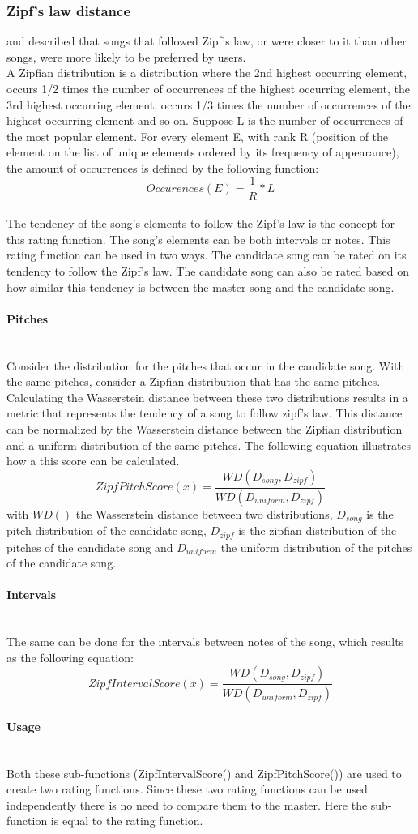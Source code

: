 \subsubsection{Zipf's law distance}
\cite{Zipfslaw_paper} and \cite{Zipfslaw_paper2} described that songs that followed Zipf's law, or were closer to it than other songs, were more likely to be preferred by users. 
\\
A Zipfian distribution is a distribution where the 2nd highest occurring element, occurs 1/2 times the number of occurrences of the highest occurring element, the 3rd highest occurring element, occurs 1/3 times the number of occurrences of the highest occurring element and so on. Suppose L is the number of occurrences of the most popular element. For every element E, with rank R (position of the element on the list of unique elements ordered by its frequency of appearance), the amount of occurrences is defined by the following function:
\[ Occurences(E) =  \frac{1}{R} * L  \]
\\
The tendency of the song's elements to follow the Zipf's law is the concept for this rating function. The song's elements can be both intervals or notes. This rating function can be used in two ways. The candidate song can be rated on its tendency to follow the Zipf's law. The candidate song can also be rated based on how similar this tendency is between the master song and the candidate song.
\paragraph{Pitches}\mbox{}\\
Consider the distribution for the pitches that occur in the candidate song. With the same pitches, consider a Zipfian distribution that has the same pitches. Calculating the Wasserstein distance between these two distributions results in a metric that represents the tendency of a song to follow zipf's law. This distance can be normalized by the Wasserstein distance between the Zipfian distribution and a uniform distribution of the same pitches. The following equation illustrates how a this score can be calculated.
\[ ZipfPitchScore(x) =  \frac{WD(D_{song},D_{zipf})}{WD(D_{uniform},D_{zipf})} \]with $WD()$ the Wasserstein distance between two distributions, $D_{song}$ is the pitch distribution of the candidate song, $D_{zipf}$ is the zipfian distribution of the pitches of the candidate song and $D_{uniform}$ the uniform distribution of the pitches of the candidate song.
\paragraph{Intervals}\mbox{}\\
The same can be done for the intervals between notes of the song, which results as the following equation:
\[ ZipfIntervalScore(x) = \frac{WD(D_{song},D_{zipf})}{WD(D_{uniform},D_{zipf})}\]
\paragraph{Usage}\mbox{}\\
Both these sub-functions (ZipfIntervalScore() and ZipfPitchScore()) are used to create two rating functions. Since these two rating functions can be used independently there is no need to compare them to the master. Here the sub-function is equal to the rating function.